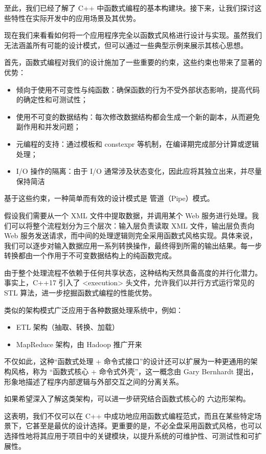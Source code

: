 至此，我们已经了解了 C++ 中函数式编程的基本构建块。接下来，让我们探讨这些特性在实际开发中的应用场景及其优势。


现在我们来看看如何将一个应用程序完全以函数式风格进行设计与实现。虽然我们无法涵盖所有可能的设计模式，但可以通过一些典型示例来展示其核心思想。

首先，函数式编程对我们的设计施加了一些重要的约束，这些约束也带来了显著的优势：

\begin{itemize}
\item 
倾向于使用不可变性与纯函数：确保函数的行为不受外部状态影响，提高代码的确定性和可测试性；

\item 
使用不可变的数据结构：每次修改数据结构都会生成一个新的副本，从而避免副作用和并发问题；

\item 
元编程的支持：通过模板和 constexpr 等机制，在编译期完成部分计算或逻辑处理；

\item 
I/O 操作的隔离：由于 I/O 通常涉及状态变化，因此应将其独立出来，并尽量保持简洁
\end{itemize}

基于这些约束，一种简单而有效的设计模式是 管道（Pipe）模式。

假设我们需要从一个 XML 文件中提取数据，并调用某个 Web 服务进行处理。我们可以将整个流程划分为三个层次：输入层负责读取 XML 文件，输出层负责向 Web 服务发送请求，而中间的处理逻辑则完全采用函数式风格实现。具体来说，我们可以逐步对输入数据应用一系列转换操作，最终得到所需的输出结果。每一步转换都由一个作用于不可变数据结构上的纯函数完成。

由于整个处理流程不依赖于任何共享状态，这种结构天然具备高度的并行化潜力。事实上，C++17 引入了 <execution> 头文件，允许我们以并行方式运行常见的 STL 算法，进一步挖掘函数式编程的性能优势。

类似的架构模式广泛应用于各种数据处理系统中，例如：

\begin{itemize}
\item 
ETL 架构（抽取、转换、加载）

\item 
MapReduce 架构，由 Hadoop 推广开来
\end{itemize}

不仅如此，这种“函数式处理 + 命令式接口”的设计还可以扩展为一种更通用的架构风格，称为 “函数式核心 + 命令式外壳”，这一概念由 Gary Bernhardt 提出，形象地描述了程序内部逻辑与外部交互之间的分离关系。

如果希望深入了解这类架构，可以进一步研究结合函数式核心的 六边形架构。

这表明，我们不仅可以在 C++ 中成功地应用函数式编程范式，而且在某些特定场景下，它甚至是最优的设计选择。更重要的是，不必全盘采用函数式风格，也可以选择性地将其应用于项目中的关键模块，以提升系统的可维护性、可测试性和可扩展性。


























